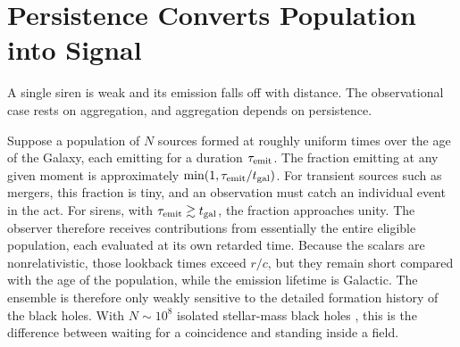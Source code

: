 \documentclass[11pt]{article}
\begin{document}
\section{Persistence Converts Population into Signal}

A single siren is weak and its emission falls off with distance. The observational case rests on aggregation, and aggregation depends on persistence.

Suppose a population of $N$ sources formed at roughly uniform times over the age of the Galaxy, each emitting for a duration $\tau_{\rm emit}$. The fraction emitting at any given moment is approximately $\min(1, \tau_{\rm emit}/t_{\rm gal})$. For transient sources such as mergers, this fraction is tiny, and an observation must catch an individual event in the act. For sirens, with $\tau_{\rm emit} \gtrsim t_{\rm gal}$, the fraction approaches unity. The observer therefore receives contributions from essentially the entire eligible population, each evaluated at its own retarded time. Because the scalars are nonrelativistic, those lookback times exceed $r/c$, but they remain short compared with the age of the population, while the emission lifetime is Galactic. The ensemble is therefore only weakly sensitive to the detailed formation history of the black holes. With $N \sim 10^{8}$ isolated stellar-mass black holes \cite{GavilanMartin2026}, this is the difference between waiting for a coincidence and standing inside a field.
\end{document}
